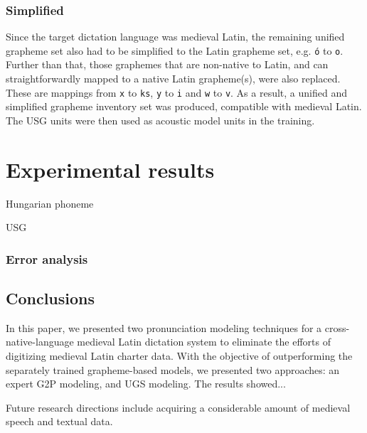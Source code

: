 \documentclass[runningheads,a4paper]{llncs}
\begin{document}
\subsubsection{Simplified}\label{simplified}
Since the target dictation language was medieval Latin, the remaining unified grapheme set also had to be simplified to the Latin grapheme set, e.g. \texttt{\'{o}} to \texttt{o}.
Further than that, those graphemes that are non-native to Latin, and can straightforwardly mapped to a native Latin grapheme(s), were also replaced.
These are mappings from \texttt{x} to \texttt{ks}, \texttt{y} to \texttt{i} and \texttt{w} to \texttt{v}.
As a result, a unified and simplified grapheme inventory set was produced, compatible with medieval Latin.
The USG units were then used as acoustic model units in the training.
\section{Experimental results}
\begin{table}
\parbox{.45\linewidth}{
\centering
\caption{Hungarian phoneme}

}
\hfill
\parbox{.45\linewidth}{
\centering
\caption{USG}

}
\end{table}
\subsubsection{Error analysis}
\subsection{Conclusions}
In this paper, we presented two pronunciation modeling techniques for a cross-native-language medieval Latin dictation system to eliminate the efforts of digitizing medieval Latin charter data.
With the objective of outperforming the separately trained grapheme-based models, we presented two approaches: an expert G2P modeling, and UGS modeling.
The results showed...

Future research directions include acquiring a considerable amount of medieval speech and textual data.



\end{document}
